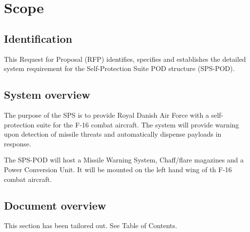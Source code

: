 \documentclass[Main]{subfiles}
\begin{document}
\chapter{Scope}

\section{Identification}
This Request for Proposal (RFP) identifies, specifies and establishes the detailed system requirement for the Self-Protection Suite POD structure (SPS-POD).

\section{System overview}
The purpose of the SPS is to provide Royal Danish Air Force with a self-protection suite for the F-16 combat aircraft. The system will provide warning upon detection of missile threats and automatically dispense payloads in response.

The SPS-POD will host a Missile Warning System, Chaff/flare magazines and a Power Conversion Unit. It will be mounted on the left hand wing of th F-16 combat aircraft.
\section{Document overview}
This section has been tailored out. See Table of Contents.
\end{document}
